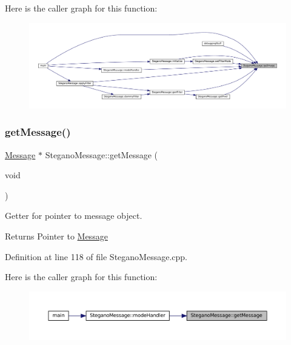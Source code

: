 Here is the caller graph for this function\+:\nopagebreak
\begin{figure}[H]
\begin{center}
\leavevmode
\includegraphics[width=350pt]{classSteganoMessage_a2e3ad705a0219edfd2150f3f7931979c_icgraph}
\end{center}
\end{figure}
\mbox{\label{classSteganoMessage_ad29978e925056ad70dc5c45b1e1681eb}} 
\subsubsection{\texorpdfstring{getMessage()}{getMessage()}}
{\footnotesize\ttfamily \mbox{\hyperlink{classMessage}{Message}} $\ast$ Stegano\+Message\+::get\+Message (\begin{DoxyParamCaption}\item[{void}]{ }\end{DoxyParamCaption})}



Getter for pointer to message object. 

\begin{DoxyReturn}{Returns}
Pointer to \mbox{\hyperlink{classMessage}{Message}} 
\end{DoxyReturn}


Definition at line 118 of file Stegano\+Message.\+cpp.

Here is the caller graph for this function\+:\nopagebreak
\begin{figure}[H]
\begin{center}
\leavevmode
\includegraphics[width=350pt]{classSteganoMessage_ad29978e925056ad70dc5c45b1e1681eb_icgraph}
\end{center}
\end{figure}
\mbox{\label{classSteganoMessage_a7dc660e6d2c8f162636f789cfedde67e}} 
